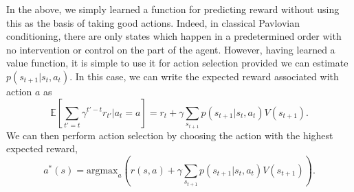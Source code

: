 In the above, we simply learned a function for predicting reward without using this as the basis of taking good actions.
Indeed, in classical Pavlovian conditioning, there are only states which happen in a predetermined order with no intervention or control on the part of the agent.
However, having learned a value function, it is simple to use it for action selection provided we can estimate $p(s_{t+1} | s_t, a_t)$.
In this case, we can write the expected reward associated with action $a$ as
\begin{equation}
    \mathbb{E} \left [\sum_{t' = t} \gamma^{t'-t} r_{t'} | a_t = a \right ] = r_t + \gamma \sum_{s_{t+1}} p(s_{t+1} | s_t, a_t) V(s_{t+1}).
\end{equation}
We can then perform action selection by choosing the action with the highest expected reward,
\begin{equation}
    \label{eq:value_action_selection}
    a^*(s) = \text{argmax}_{a} \left ( r(s, a) + \gamma \sum_{s_{t+1}} p(s_{t+1} | s_t, a_t) V(s_{t+1}) \right ).
\end{equation}


